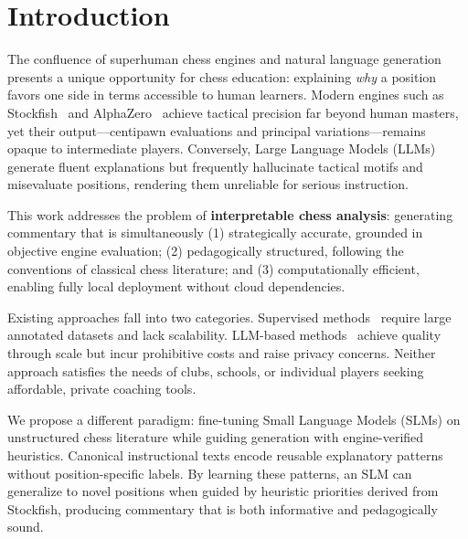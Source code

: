 \documentclass[sigconf,nonacm]{acmart}
\begin{document}
\section{Introduction}
\label{sec:introduction}

The confluence of superhuman chess engines and natural language generation presents a unique opportunity for chess education: explaining \emph{why} a position favors one side in terms accessible to human learners. Modern engines such as Stockfish~\cite{stockfish} and AlphaZero~\cite{alphazero} achieve tactical precision far beyond human masters, yet their output—centipawn evaluations and principal variations—remains opaque to intermediate players. Conversely, Large Language Models (LLMs) generate fluent explanations but frequently hallucinate tactical motifs and misevaluate positions, rendering them unreliable for serious instruction.

This work addresses the problem of \textbf{interpretable chess analysis}: generating commentary that is simultaneously (1) strategically accurate, grounded in objective engine evaluation; (2) pedagogically structured, following the conventions of classical chess literature; and (3) computationally efficient, enabling fully local deployment without cloud dependencies.

Existing approaches fall into two categories. Supervised methods~\cite{jhamtani2018chess} require large annotated datasets and lack scalability. LLM-based methods~\cite{kim2025ccc} achieve quality through scale but incur prohibitive costs and raise privacy concerns. Neither approach satisfies the needs of clubs, schools, or individual players seeking affordable, private coaching tools.

We propose a different paradigm: fine-tuning Small Language Models (SLMs) on unstructured chess literature while guiding generation with engine-verified heuristics. Canonical instructional texts encode reusable explanatory patterns without position-specific labels. By learning these patterns, an SLM can generalize to novel positions when guided by heuristic priorities derived from Stockfish, producing commentary that is both informative and pedagogically sound.


\end{document}
